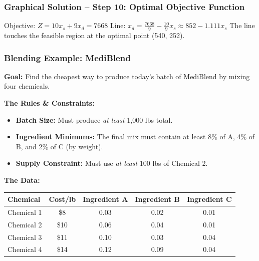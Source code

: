 \documentclass{beamer}
\begin{document}
\begin{frame}
\frametitle{Graphical Solution -- Step 10: Optimal Objective Function}
Objective: \(Z = 10 x_s + 9 x_d = 7668\)
Line: \(x_d = \frac{7668}{9} - \frac{10}{9} x_s \approx 852 - 1.111 x_s\)
The line touches the feasible region at the optimal point (540, 252).
\end{frame}






\begin{frame}
\frametitle{Blending Example: MediBlend}
\textbf{Goal:} Find the cheapest way to produce today's batch of MediBlend by mixing four chemicals.

\vspace{0.2cm}
\textbf{The Rules \& Constraints:}
\begin{itemize}
    \item \textbf{Batch Size:} Must produce \textit{at least} 1,000 lbs total.
    \item \textbf{Ingredient Minimums:} The final mix must contain at least 8\% of A, 4\% of B, and 2\% of C (by weight).
    \item \textbf{Supply Constraint:} Must use \textit{at least} 100 lbs of Chemical 2.
\end{itemize}

\vspace{0.2cm}
\textbf{The Data:}
\begin{center}
\renewcommand{\arraystretch}{1.2}
\begin{tabular}{|l|c|c|c|c|}
\hline
\textbf{Chemical} & \textbf{Cost/lb} & \textbf{Ingredient A} & \textbf{Ingredient B} & \textbf{Ingredient C} \\
\hline
Chemical 1 & \$8 & 0.03 & 0.02 & 0.01 \\
Chemical 2 & \$10 & 0.06 & 0.04 & 0.01 \\
Chemical 3 & \$11 & 0.10 & 0.03 & 0.04 \\
Chemical 4 & \$14 & 0.12 & 0.09 & 0.04 \\
\hline
\end{tabular}
\end{center}
\end{frame}
\end{document}
